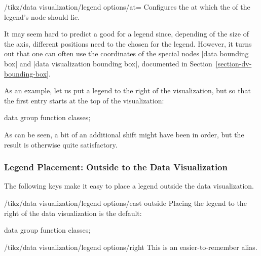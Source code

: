 \begin{key}{/tikz/data visualization/legend options/at=}
    Configures the  at which the  of the legend's
    node should lie.

    It may seem hard to predict a good  for a legend since,
    depending of the size of the axis, different positions need to the chosen
    for the legend. However, it turns out that one can often use the
    coordinates of the special nodes |data bounding box| and
    |data visualization bounding box|, documented in
    Section~\ref{section-dv-bounding-box}.

    As an example, let us put a legend to the right of the visualization, but
    so that the first entry starts at the top of the visualization:
\begin{codeexample}[width=8cm]
\tikz \datavisualization [
  scientific axes, x axis={label=$x$},
  visualize as smooth line/.list=
    {log, lin, squared, exp},
  legend={anchor=north west, at=
    (data visualization bounding box.north east)},
  log=    {label in legend={text=$\log x$}},
  lin=    {label in legend={text=$x/2$}},
  squared={label in legend={text=$x^2$}},
  exp=    {label in legend={text=$e^x$}},
  style sheet=vary dashing]
data group {function classes};
\end{codeexample}
    As can be seen, a bit of an additional shift might have been in order, but
    the result is otherwise quite satisfactory.
\end{key}


\subsubsection{Legend Placement: Outside to the Data Visualization}
\label{section-dv-legend-outside}

The following keys make it easy to place a legend outside the data
visualization.

\begin{key}{/tikz/data visualization/legend options/east outside}
    Placing the legend to the right of the data visualization is the default:
\begin{codeexample}[width=8cm]
\tikz \datavisualization [
  scientific axes,
  visualize as smooth line/.list=
    {log, lin, squared, exp},
  legend=east outside,
  log=    {label in legend={text=$\log x$}},
  lin=    {label in legend={text=$x/2$}},
  squared={label in legend={text=$x^2$}},
  exp=    {label in legend={text=$e^x$}},
  style sheet=strong colors]
data group {function classes};
\end{codeexample}

    \begin{key}{/tikz/data visualization/legend options/right}
        This is an easier-to-remember alias.
    \end{key}
\end{key}

